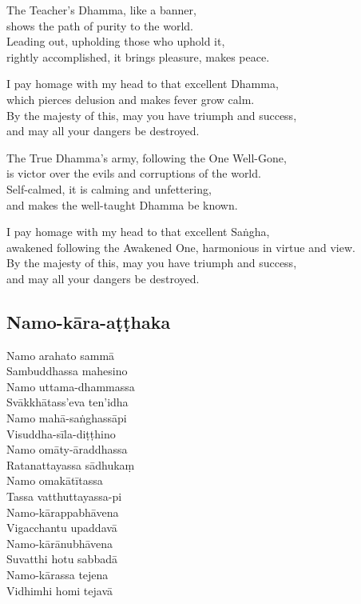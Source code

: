 The Teacher's Dhamma, like a banner,\\
shows the path of purity to the world.\\
Leading out, upholding those who uphold it,\\
rightly accomplished, it brings pleasure, makes peace.

I pay homage with my head to that excellent Dhamma,\\
which pierces delusion and makes fever grow calm.\\
By the majesty of this, may you have triumph and success,\\
and may all your dangers be destroyed.

The True Dhamma's army, following the One Well-Gone,\\
is victor over the evils and corruptions of the world.\\
Self-calmed, it is calming and unfettering,\\
and makes the well-taught Dhamma be known.

I pay homage with my head to that excellent Saṅgha,\\
awakened following the Awakened One, harmonious in virtue and view.\\
By the majesty of this, may you have triumph and success,\\
and may all your dangers be destroyed.

\subsection{Namo-kāra-aṭṭhaka}
\label{namo-arahato}


\begin{paritta}
  Namo arahato sammā\\
  Sambuddhassa mahesino\\
  Namo uttama-dhammassa\\
  Svākkhātass'eva ten'idha\\
  Namo mahā-saṅghassāpi\\
  Visuddha-sīla-diṭṭhino\\
  Namo omāty-āraddhassa\\
  Ratanattayassa sādhukaṃ\\
  Namo omakātītassa\\
  Tassa vatthuttayassa-pi\\
  Namo-kārappabhāvena\\
  Vigacchantu upaddavā\\
  Namo-kārānubhāvena\\
  Suvatthi hotu sabbadā\\
  Namo-kārassa tejena\\
  Vidhimhi homi tejavā 
\end{paritta}

